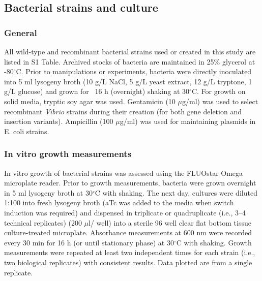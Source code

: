{{{{{{{\subsection{Bacterial strains and culture}

\subsubsection{General}
All wild-type and recombinant bacterial strains used or created in this study are listed in S1 Table. Archived stocks of bacteria are maintained in 25\% glycerol at -80$^\circ$C. Prior to manipulations or experiments, bacteria were directly inoculated into 5 ml lysogeny broth (10 g/L NaCl, 5 g/L yeast extract, 12 g/L tryptone, 1 g/L glucose) and grown for ~16 h (overnight) shaking at 30$^\circ$C. For growth on solid media, tryptic soy agar was used. Gentamicin (10 $\mu$g/ml) was used to select recombinant \textit{Vibrio} strains during their creation (for both gene deletion and insertion variants). Ampicillin (100 $\mu$g/ml) was used for maintaining plasmids in E. coli strains. 

\subsubsection{In vitro growth measurements}
In vitro growth of bacterial strains was assessed using the FLUOstar Omega microplate reader. Prior to growth measurements, bacteria were grown overnight in 5 ml lysogeny broth at 30$^\circ$C with shaking. The next day, cultures were diluted 1:100 into fresh lysogeny broth (aTc was added to the media when switch induction was required) and dispensed in triplicate or quadruplicate (i.e., 3–4 technical replicates) (200 $\mu$l/ well) into a sterile 96 well clear flat bottom tissue culture-treated microplate. Absorbance measurements at 600 nm were recorded every 30 min for 16 h (or until stationary phase) at 30$^\circ$C with shaking. Growth measurements were repeated at least two independent times for each strain (i.e., two biological replicates) with consistent results. Data plotted are from a single replicate.

}}}}}}}
